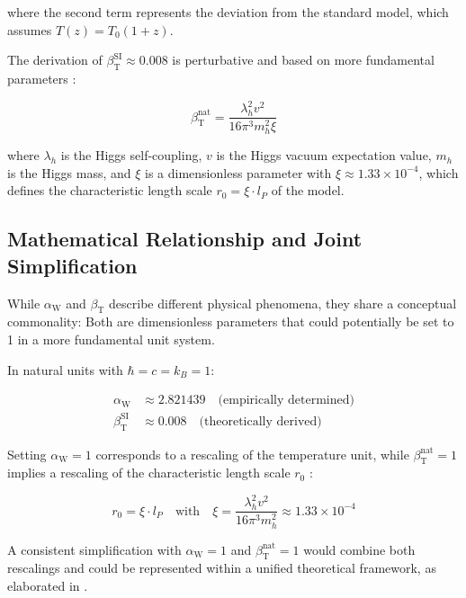 \documentclass[12pt,a4paper]{article}
\newcommand{\betaT}{\beta_{\text{T}}}
\newcommand{\alphaW}{\alpha_{\text{W}}}
\begin{document}
	where the second term represents the deviation from the standard model, which assumes \(T(z) = T_0 (1 + z)\).
	
	The derivation of \(\betaT^{\text{SI}} \approx 0.008\) is perturbative and based on more fundamental parameters \cite{pascher_params_2025}:
	
	\begin{equation}
		\betaT^{\text{nat}} = \frac{\lambda_h^2 v^2}{16\pi^3 m_h^2 \xi}
	\end{equation}
	
	where \(\lambda_h\) is the Higgs self-coupling, \(v\) is the Higgs vacuum expectation value, \(m_h\) is the Higgs mass, and \(\xi\) is a dimensionless parameter with \(\xi \approx 1.33 \times 10^{-4}\), which defines the characteristic length scale \(r_0 = \xi \cdot l_P\) of the model.
	
	\subsection{Mathematical Relationship and Joint Simplification}
	\label{subsec:joint_simplification}
	
	While \(\alphaW\) and \(\betaT\) describe different physical phenomena, they share a conceptual commonality: Both are dimensionless parameters that could potentially be set to 1 in a more fundamental unit system.
	
	In natural units with \(\hbar = c = k_B = 1\):
	
	\begin{align}
		\alphaW &\approx 2.821439 \quad \text{(empirically determined)} \\
		\betaT^{\text{SI}} &\approx 0.008 \quad \text{(theoretically derived)}
	\end{align}
	
	Setting \(\alphaW = 1\) corresponds to a rescaling of the temperature unit, while \(\betaT^{\text{nat}} = 1\) implies a rescaling of the characteristic length scale \(r_0\) \cite{pascher_params_2025}:
	
	\begin{equation}
		r_0 = \xi \cdot l_P \quad \text{with} \quad \xi = \frac{\lambda_h^2 v^2}{16\pi^3 m_h^2} \approx 1.33 \times 10^{-4}
	\end{equation}
	
	A consistent simplification with \(\alphaW = 1\) and \(\betaT^{\text{nat}} = 1\) would combine both rescalings and could be represented within a unified theoretical framework, as elaborated in \cite{pascher_alphabeta_2025}.
	
\end{document}
